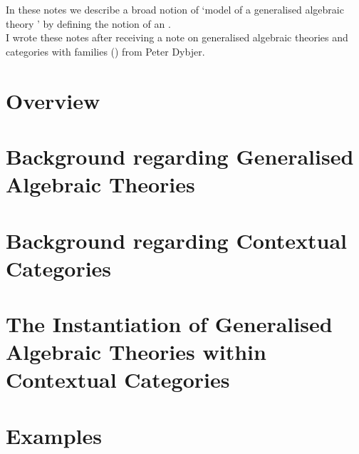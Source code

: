 \documentclass[10pt,a4paper]{article}
\theoremstyle{remark}
\begin{document}
\newcommand{\gatinterpretationaxcondrhscontinuation}[2]{ &&&& \cellcolor{lightergrey}\hspace{0.5cm} $#1$ &{#2}}

\newcommand{\gatinterpretationaxeqv}[2]{&&$\scriptstyle iff$&&$#1$&#2}


\newcommand{\bigtuple}[1]{\big \langle #1 \big \rangle}


\newcommand{\highlightpara}[1]{\colorbox{highlight}{%
    \parbox{\dimexpr\linewidth-2\fboxsep}%
        {#1}}
}
		
In these notes we describe a broad notion of `model of a generalised algebraic theory \gatUw' by defining the notion of 
an . \\

I wrote these notes after receiving a note on generalised algebraic theories and categories with families
 (\cite{BCDEpaper}) from Peter Dybjer. 
\section{Overview}


\section{Background regarding Generalised Algebraic Theories}


\section{Background regarding Contextual Categories}


\section{The Instantiation of Generalised Algebraic Theories within Contextual Categories}
\label{sectioninwhichinstantiationisdefined}


\section{Examples}
\end{document}
